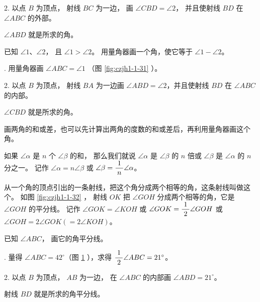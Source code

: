 2. 以点 $B$ 为顶点， 射线 $BC$ 为一边， 画 $\angle CBD = \angle 2$， 并且使射线 $BD$ 在 $\angle ABC$ 的外部。

$\angle ABD$ 就是所求的角。



\liti 已知 $\angle 1$、$\angle 2$， 且 $\angle 1 > \angle 2$。 用量角器画一个角，使它等于 $\angle 1 - \angle 2$。

. 用量角器画 $\angle ABC = \angle 1$ （图 \ref{fig:czjh1-1-31} ）。

2. 以点 $B$ 为顶点， 射线 $BA$ 为一边画 $\angle ABD = \angle 2$，并且使射线 $BD$ 在 $\angle ABC$ 的内部。

$\angle CBD$ 就是所求的角。


画两角的和或差，也可以先计算出两角的度数的和或差后，再利用量角器画这个角。

\begin{enhancedline}
如果 $\angle \alpha$ 是 $n$ 个 $\angle \beta$ 的和，
那么我们就说 $\angle \alpha$ 是 $\angle \beta$ 的 $n$ 倍或 $\angle \beta$ 是 $\angle \alpha$ 的 $n$ 分之一。
记作 $\angle \alpha = n \angle \beta$ 或 $\angle \beta = \dfrac{\; 1 \;}{n} \angle \alpha$。

从一个角的顶点引出的一条射线，把这个角分成两个相等的角，这条射线叫做这个。
如图 \ref{fig:czjh1-1-32} ， 射线 $OK$ 把 $\angle GOH$ 分成两个相等的角，它是 $\angle GOH$ 的平分线。
记作 $\angle GOK = \angle KOH$ 或 $\angle GOK = \dfrac{\; 1 \;}{2} \angle GOH$ 或 $\angle GOH = 2 \angle GOK ( = 2 \angle KOH)$。

\begin{figure}[htbp]
    \centering
    \begin{minipage}[b]{7cm}
        \centering
        
        \caption{}\label{fig:czjh1-1-32}
    \end{minipage}
    \qquad
    \begin{minipage}[b]{7cm}
        \centering
        
        \caption{}\label{fig:czjh1-1-33}
    \end{minipage}
\end{figure}

\liti 已知 $\angle ABC$， 画它的角平分线。

. 量得 $\angle ABC = 42^\circ$（图 \ref{fig:czjh1-1-33} ），求得 $\dfrac{\; 1 \;}{2} \angle ABC = 21^\circ$。

2. 以点 $B$ 为顶点， $AB$ 为一边， 在 $\angle ABC$ 的内部画 $\angle ABD = 21^\circ$。

射线 $BD$ 就是所求的角平分线。
\end{enhancedline}


